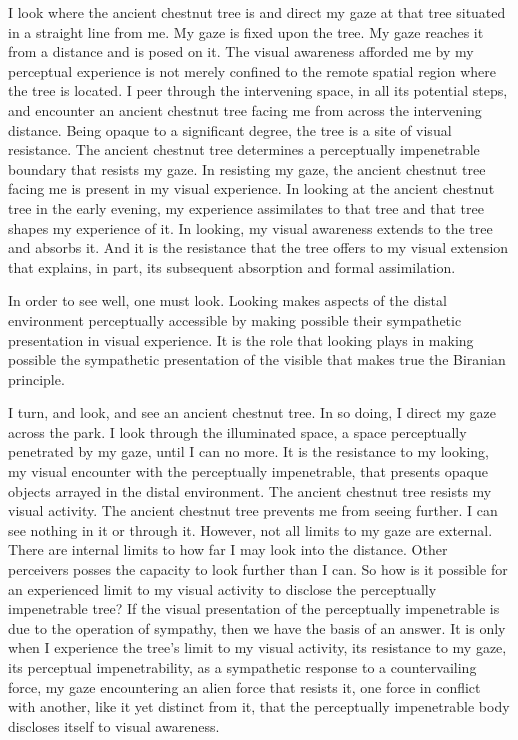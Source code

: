 I look where the ancient chestnut tree is and direct my gaze at that tree situated in a straight line from me. My gaze is fixed upon the tree. My gaze reaches it from a distance and is posed on it. The visual awareness afforded me by my perceptual experience is not merely confined to the remote spatial region where the tree is located. I peer through the intervening space, in all its potential steps, and encounter an ancient chestnut tree facing me from across the intervening distance. Being opaque to a significant degree, the tree is a site of visual resistance. The ancient chestnut tree determines a perceptually impenetrable boundary that resists my gaze. In resisting my gaze, the ancient chestnut tree facing me is present in my visual experience. In looking at the ancient chestnut tree in the early evening, my experience assimilates to that tree and that tree shapes my experience of it. In looking, my visual awareness extends to the tree and absorbs it. And it is the resistance that the tree offers to my visual extension that explains, in part, its subsequent absorption and formal assimilation.

In order to see well, one must look. Looking makes aspects of the distal environment perceptually accessible by making possible their sympathetic presentation in visual experience. It is the role that looking plays in making possible the sympathetic presentation of the visible that makes true the Biranian principle.

I turn, and look, and see an ancient chestnut tree. In so doing, I direct my gaze across the park. I look through the illuminated space, a space perceptually penetrated by my gaze, until I can no more. It is the resistance to my looking, my visual encounter with the perceptually impenetrable, that presents opaque objects arrayed in the distal environment. The ancient chestnut tree resists my visual activity. The ancient chestnut tree prevents me from seeing further. I can see nothing in it or through it. However, not all limits to my gaze are external. There are internal limits to how far I may look into the distance. Other perceivers posses the capacity to look further than I can. So how is it possible for an experienced limit to my visual activity to disclose the perceptually impenetrable tree? If the visual presentation of the perceptually impenetrable is due to the operation of sympathy, then we have the basis of an answer. It is only when I experience the tree's limit to my visual activity, its resistance to my gaze, its perceptual impenetrability, as a sympathetic response to a countervailing force, my gaze encountering an alien force that resists it, one force in conflict with another, like it yet distinct from it, that the perceptually impenetrable body discloses itself to visual awareness.

